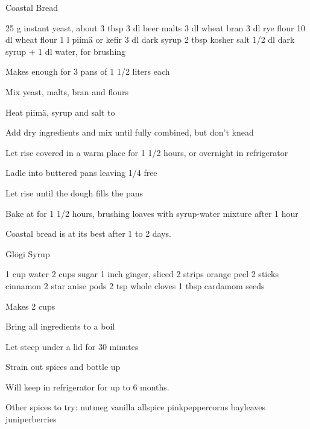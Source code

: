 \begin{denserecipe}{Coastal Bread}{}
\begin{ingredients}
25 g instant yeast, about 3 tbsp
3 dl beer malts
3 dl wheat bran
3 dl rye flour
10 dl wheat flour
1 l piimä or kefir
3 dl dark syrup
2 tbsp kosher salt
1/2 dl dark syrup + 1 dl water, for brushing
\end{ingredients}
\nextcolumn
Makes enough for 3 pans of 1 1/2 liters each
\begin{steps}
    \item Mix yeast, malts, bran and flours
    \item Heat piimä, syrup and salt to 
    \item Add dry ingredients and mix until fully combined, but don't knead
    \item Let rise covered in a warm place for 1 1/2 hours, or overnight in refrigerator
    \item Ladle into buttered pans leaving 1/4 free
    \item Let rise until the dough fills the pans
    \item Bake at  for 1 1/2 hours, brushing loaves with syrup-water mixture after 1 hour
\end{steps}
Coastal bread is at its best after 1 to 2 days.
\end{denserecipe}

\begin{recipe}{Glögi Syrup}{}
\begin{ingredients}
1 cup water
2 cups sugar
1 inch ginger, sliced
2 strips orange peel
2 sticks cinnamon
2 star anise pods
2 tsp whole cloves
1 tbsp cardamom seeds
\end{ingredients}
\nextcolumn
Makes 2 cups
\begin{steps}
    \item Bring all ingredients to a boil
    \item Let steep under a lid for 30 minutes
    \item Strain out spices and bottle up
\end{steps}
Will keep in refrigerator for up to 6 months.

Other spices to try: nutmeg vanilla allspice pink\ijoin{}peppercorns bay\ijoin{}leaves juniper\ijoin{}berries
\end{recipe}


